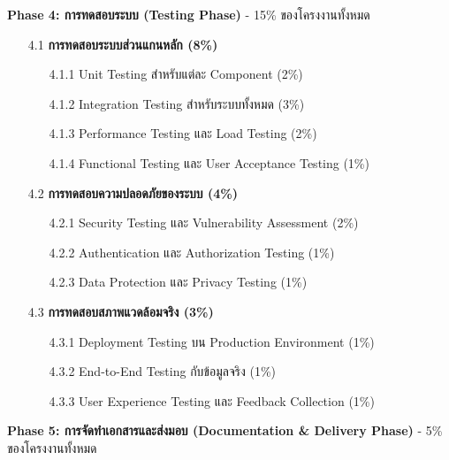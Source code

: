 \documentclass[12pt,a4paper]{article}
\newcommand{\textlight}[1]{{\thailightfont #1}}
\begin{document}
\begin{enumerate}[leftmargin=2cm]
{        \textbf{Phase 4: การทดสอบระบบ (Testing Phase)} \textlight{- 15\% ของโครงงานทั้งหมด}

        \begin{enumerate}
            \item[4.1] \textbf{การทดสอบระบบส่วนแกนหลัก (8\%)}
            \begin{enumerate}
                \item[4.1.1] Unit Testing สำหรับแต่ละ Component (2\%)
                \item[4.1.2] Integration Testing สำหรับระบบทั้งหมด (3\%)
                \item[4.1.3] Performance Testing และ Load Testing (2\%)
                \item[4.1.4] Functional Testing และ User Acceptance Testing (1\%)
            \end{enumerate}
            
            \item[4.2] \textbf{การทดสอบความปลอดภัยของระบบ (4\%)}
            \begin{enumerate}
                \item[4.2.1] Security Testing และ Vulnerability Assessment (2\%)
                \item[4.2.2] Authentication และ Authorization Testing (1\%)
                \item[4.2.3] Data Protection และ Privacy Testing (1\%)
            \end{enumerate}
            
            \item[4.3] \textbf{การทดสอบสภาพแวดล้อมจริง (3\%)}
            \begin{enumerate}
                \item[4.3.1] Deployment Testing บน Production Environment (1\%)
                \item[4.3.2] End-to-End Testing กับข้อมูลจริง (1\%)
                \item[4.3.3] User Experience Testing และ Feedback Collection (1\%)
            \end{enumerate}
        \end{enumerate}

        \vspace{1.6cm}

        \textbf{Phase 5: การจัดทำเอกสารและส่งมอบ (Documentation \& Delivery Phase)} \textlight{- 5\% ของโครงงานทั้งหมด}

}
\end{enumerate}
\end{document}
